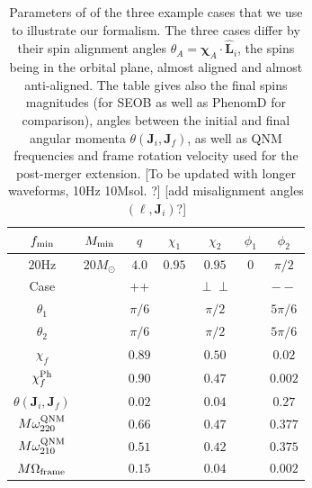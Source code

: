 \documentclass[aps,showpacs,twocolumn,
prd,superscriptaddress,nofootinbib]{revtex4-1}
\newcommand{\Msol}{M_{\odot}}
\newcommand{\SM}[1]{{\color{Red} #1}}
\begin{document}
\begin{table}[t]
\begin{ruledtabular}\caption{Parameters of of the three example cases that we use to illustrate our formalism. The three cases differ by their spin alignment angles $\theta_{A} = \bm{\chi}_{A} \cdot \hat{\bm{L}}_{i}$, the spins being in the orbital plane, almost aligned and almost anti-aligned. The table gives also the final spins magnitudes (for SEOB as well as PhenomD for comparison), angles between the initial and final angular momenta $\theta(\bm{J}_{i}, \bm{J}_{f})$, as well as QNM frequencies and frame rotation velocity used for the post-merger extension. \SM{[To be updated with longer waveforms, 10Hz 10Msol. ?]} \SM{[add misalignment angles $(\ell, \bm{J}_{i})$?]}}\label{tab:precparams}
\begin{tabular}{ccccccc}\label{tab:precexamples}
	$f_{\rm min}$ & $ M_{\rm min} $ & $q$ & $\chi_{1}$ & $\chi_{2}$ & $ \phi_{1} $ & $ \phi_{2} $ \\
	\hline
	$20\mathrm{Hz}$ & $20\Msol$ & $ 4.0 $ & $ 0.95 $ & $ 0.95 $ & $0$ & $\pi/2$ \\
	\hline\hline
	Case && ++ && $\perp\perp$ && $--$ \\
	\hline
	$\theta_{1}$ && $\pi/6$ && $\pi/2$ && $5\pi/6$ \\
	$\theta_{2}$ && $\pi/6$ && $\pi/2$ && $5\pi/6$ \\
	\hline
	$\chi_{f}$ && $0.89$ && $0.50$ && $0.02$ \\
	$\chi_{f}^{\rm Ph}$ && $0.90$ && $0.47$ && $0.002$ \\
	$\theta(\bm{J}_{i}, \bm{J}_{f})$ && $0.02$ && $0.04$ && $0.27$ \\
	$M \omega_{220}^{\rm QNM}$ && $0.66$ && $0.47$ && $0.377$ \\
	$M \omega_{210}^{\rm QNM}$ && $0.51$ && $0.42$ && $0.375$ \\
	$M \Omega_{\rm frame}$ && $0.15$ && $0.04$ && $0.002$ \\
\end{tabular}
\end{ruledtabular}
\end{table}
\end{document}
